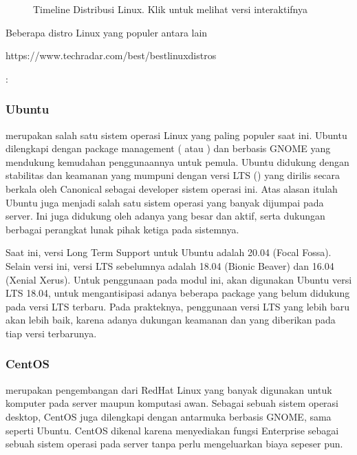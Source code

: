 \documentclass[letterpaper,10pt,english]{sphinxmanual}
\begin{document}
\begin{figure}[htbp]
\centering
\capstart

\noindent{}
\caption{Timeline Distribusi Linux. Klik  untuk melihat versi interaktifnya}\label{\detokenize{sesi1/pengantarlinux:distro-linux}}\end{figure}

Beberapa distro Linux yang populer antara lain %
\begin{footnote}[1]\sphinxAtStartFootnote
https://www.techradar.com/best/best\sphinxhyphen{}linux\sphinxhyphen{}distros
%
\end{footnote}:


\subsubsection{Ubuntu}
\label{\detokenize{sesi1/pengantarlinux:ubuntu}}
 merupakan salah satu sistem operasi Linux yang paling populer saat ini. Ubuntu dilengkapi dengan package management ( atau ) dan  berbasis GNOME yang mendukung kemudahan penggunaannya untuk pemula. Ubuntu didukung dengan stabilitas dan keamanan yang mumpuni dengan versi LTS () yang dirilis secara berkala oleh Canonical sebagai developer sistem operasi ini. Atas alasan itulah Ubuntu juga menjadi salah satu sistem operasi yang banyak dijumpai pada server. Ini juga didukung oleh adanya  yang besar dan aktif, serta dukungan berbagai perangkat lunak pihak ketiga pada sistemnya.


Saat ini, versi Long Term Support untuk Ubuntu adalah 20.04 (Focal Fossa). Selain versi ini, versi LTS sebelumnya adalah 18.04 (Bionic Beaver) dan 16.04 (Xenial Xerus). Untuk penggunaan pada modul ini, akan digunakan Ubuntu versi LTS 18.04, untuk mengantisipasi adanya beberapa package yang belum didukung pada versi LTS terbaru. Pada prakteknya, penggunaan versi LTS yang lebih baru akan lebih baik, karena adanya dukungan keamanan dan  yang diberikan pada tiap versi terbarunya.


\subsubsection{CentOS}
\label{\detokenize{sesi1/pengantarlinux:centos}}
 merupakan pengembangan dari RedHat Linux yang banyak digunakan untuk komputer pada server maupun komputasi awan. Sebagai sebuah sistem operasi desktop, CentOS juga dilengkapi dengan antarmuka berbasis GNOME, sama seperti Ubuntu. CentOS dikenal karena menyediakan fungsi Enterprise sebagai sebuah sistem operasi pada server tanpa perlu mengeluarkan biaya sepeser pun.
\end{document}
